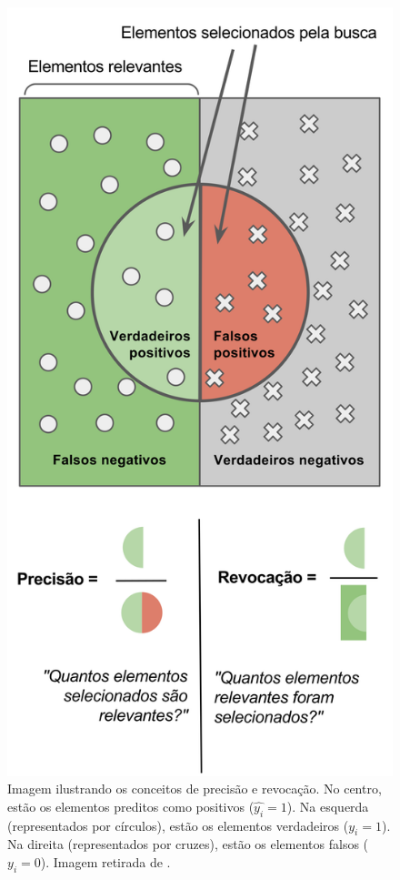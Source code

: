 \begin{figure}[h]
\centering
\includegraphics[scale=1]{Res/precision_recall.png}
\caption{Imagem ilustrando os conceitos de precisão e revocação. No centro,
estão os elementos preditos como positivos ($\hat{y_i}=1$). Na esquerda
(representados por círculos), estão os elementos verdadeiros ($y_i=1$). Na
direita (representados por cruzes), estão os elementos falsos ($y_i=0$). Imagem
retirada de \cite{bernadofbbraga:2017:precisao_revocacao}.}
\label{precision_recall.png}
\end{figure}


